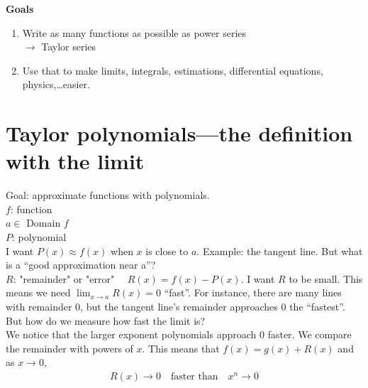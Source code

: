 \textbf{Goals} \begin{enumerate}
    \item Write as many functions as possible as power series \\
          \(\longrightarrow\) Taylor series
    \item Use that to make limits, integrals, estimations, differential equations, physics,\dots easier.
\end{enumerate}

\newpage
\section{Taylor polynomials---the definition with the limit}
Goal: approximate functions with polynomials. \\
\(f\): function \\
\(a \in\) Domain \(f\) \\
\(P\): polynomial \\

I want \(P(x) \approx f(x)\) when \(x\) is close to \(a\). Example: the tangent line. But what is a ``good approximation near a''? \\
\(R\): "remainder" or "error" \(\quad R(x) = f(x) - P(x)\). I want \(R\) to be small. This means we need \(\lim_{x \to a} R(x) = 0 \) ``fast''. For instance, there are many lines with remainder \(0\), but the tangent line's remainder approaches \(0\) the ``fastest''. But how do we measure how fast the limit is? \\
We notice that the larger exponent polynomials approach \(0\) faster. We compare the remainder with powers of \(x\).
This means that \(f(x) = g(x) + R(x)\) and as \(x \to 0\), \begin{align*}
    R(x) \to 0 \quad \text{faster than} \quad x^n \to 0
\end{align*}

